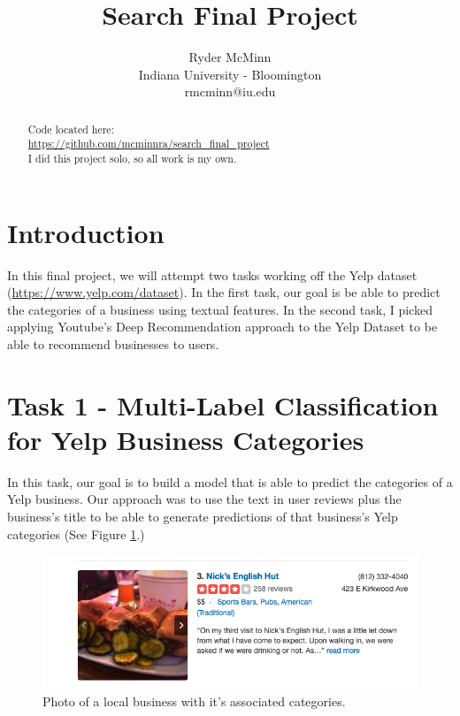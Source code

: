 \documentclass{article}
\title{Search Final Project}
\author{
Ryder McMinn\\
\affiliations
Indiana University - Bloomington\\
\emails
rmcminn@iu.edu
}
\begin{document}
\maketitle

\begin{abstract}
	Code located here:\\ \url{https://github.com/mcminnra/search_final_project}\\
	
	I did this project solo, so all work is my own. 
\end{abstract}

\section*{Introduction}

In this final project, we will attempt two tasks working off the Yelp dataset (\url{https://www.yelp.com/dataset}). In the first task, our goal is be able to predict the categories of a business using textual features. In the second task, I picked applying Youtube's Deep Recommendation approach \cite{youtubedeep} to the Yelp Dataset to be able to recommend businesses to users.

\section*{Task 1 - Multi-Label Classification for Yelp Business Categories}

In this task, our goal is to build a model that is able to predict the categories of a Yelp business. Our approach was to use the text in user reviews plus the business's title to be able to generate predictions of that business's Yelp categories (See Figure \ref{fig:yelp_categories}.)

\begin{figure}[h!]
	\includegraphics[width=\linewidth]{img/yelp_categories.png}
	\caption{Photo of a local business with it's associated categories.}
	\label{fig:yelp_categories}
\end{figure}
\end{document}
